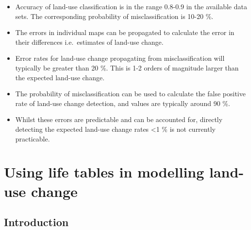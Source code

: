 \documentclass[
]{book}
\providecommand{\tightlist}{%
  \setlength{\itemsep}{0pt}\setlength{\parskip}{0pt}}
\begin{document}
\begin{itemize}
\tightlist
\item
  Accuracy of land-use classification is in the range 0.8-0.9 in the available data sets. The corresponding probability of misclassification is 10-20 \%.
\item
  The errors in individual maps can be propagated to calculate the error in their differences i.e.~estimates of land-use change.
\item
  Error rates for land-use change propagating from misclassification will typically be greater than 20 \%. This is 1-2 orders of magnitude larger than the expected land-use change.
\item
  The probability of misclassification can be used to calculate the false positive rate of land-use change detection, and values are typically around 90 \%.
\item
  Whilst these errors are predictable and can be accounted for, directly detecting the expected land-use change rates \textless1 \% is not currently practicable.
\end{itemize}

\hypertarget{using-life-tables-in-modelling-land-use-change}{%
\chapter{Using life tables in modelling land-use change}\label{using-life-tables-in-modelling-land-use-change}}

\hypertarget{introduction-5}{%
\section{Introduction}\label{introduction-5}}
\end{document}
